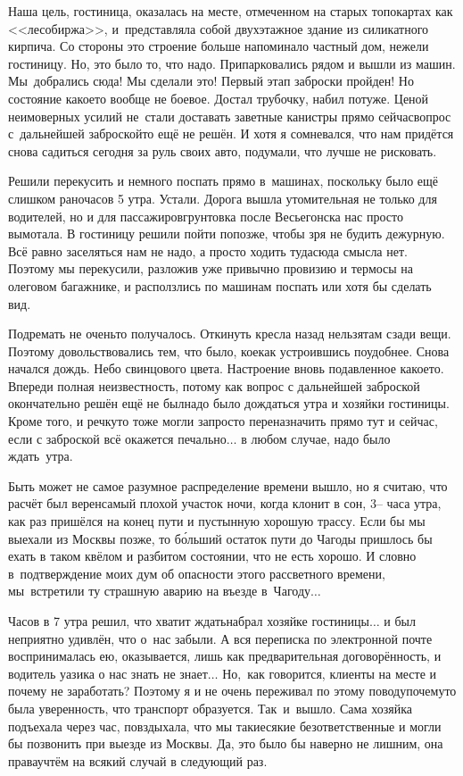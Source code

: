 Наша цель, гостиница, оказалась на месте, отмеченном на старых топокартах как <<лесобиржа>>, и~представляла собой двухэтажное здание из силикатного кирпича. Со стороны это строение больше напоминало частный дом, нежели гостиницу. Но, это было то, что надо. Припарковались рядом и вышли из машин. Мы~добрались сюда! Мы сделали это! Первый этап заброски пройден! Но состояние какое\sdash то вообще не боевое. Достал трубочку, набил потуже. Ценой неимоверных усилий не~стали доставать заветные канистры прямо сейчас\mdash вопрос с~дальнейшей заброской\sdash то ещё не решён. И хотя я сомневался, что нам придётся снова садиться сегодня за руль своих авто, подумали, что лучше не рисковать. 

Решили перекусить и немного поспать прямо в~машинах, поскольку было ещё слишком рано\mdash часов 5 утра. Устали. Дорога вышла утомительная не только для водителей, но и для пассажиров\mdash грунтовка после Весьегонска нас просто вымотала. В гостиницу решили пойти попозже, чтобы зря не будить дежурную. Всё равно заселяться нам не надо, а просто ходить туда\sdash сюда смысла нет. Поэтому мы перекусили, разложив уже привычно провизию и термосы на олеговом багажнике, и расползлись по машинам поспать или хотя бы сделать вид. 

Подремать не очень\sdash то получалось. Откинуть кресла назад нельзя\mdash там сзади вещи. Поэтому довольствовались тем, что было, кое\sdash как устроившись поудобнее. Снова начался дождь. Небо свинцового цвета. Настроение вновь подавленное какое\sdash то. Впереди полная неизвестность, потому как вопрос с дальнейшей заброской окончательно решён ещё не был\mdash надо было дождаться утра и хозяйки гостиницы. Кроме того, и речку\sdash то тоже могли запросто переназначить прямо тут и сейчас, если с заброской всё окажется печально$\ldots$ в любом случае, надо было ждать~утра. 

Быть может не самое разумное распределение времени вышло, но я считаю, что расчёт был верен\mdash самый плохой участок ночи, когда клонит в сон, 3\thinspace\nobreakdash-- часа утра, как раз пришёлся на конец пути и пустынную хорошую трассу. Если бы мы выехали из Москвы позже, то б\'{о}льший остаток пути до Чагоды пришлось бы ехать в таком квёлом и разбитом состоянии, что не есть хорошо. И словно в~подтверждение моих дум об опасности этого рассветного времени, мы~встретили ту страшную аварию на въезде в~Чагоду$\ldots$

Часов в 7 утра решил, что хватит ждать\mdash набрал хозяйке гостиницы$\ldots$ и был неприятно удивлён, что о~нас забыли. А вся переписка по электронной почте воспринималась ею, оказывается, лишь как предварительная договорённость, и водитель уазика о нас знать не знает$\ldots$ Но,~как говорится, клиенты на месте и почему не заработать? Поэтому я и не очень переживал по этому поводу\mdash почему\sdash то была уверенность, что транспорт образуется. Так~и~вышло. Сама хозяйка подъехала через час, повздыхала, что мы такие\sdash сякие безответственные и могли бы позвонить при выезде из Москвы. Да, это было бы наверно не лишним, она права\mdash учтём на всякий случай в следующий раз. 

